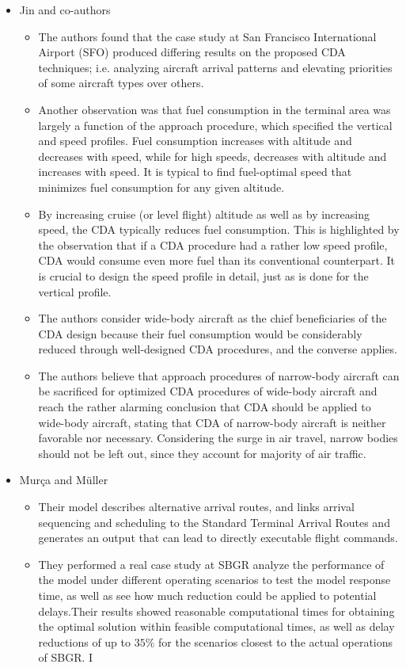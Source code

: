 \documentclass{aer1315-pretty}
\begin{document}
\begin{itemize}
\item Jin and co-authors \cite{Jin:2013} 
\begin{itemize}
\item The authors found that the case study at San Francisco International Airport (SFO) produced differing results on the proposed CDA techniques; i.e. analyzing aircraft arrival patterns and elevating priorities of some aircraft types over others.
\item Another observation was that fuel consumption in the terminal area was largely a function of the approach procedure, which specified the vertical and speed profiles. Fuel consumption increases with altitude and decreases with speed, while for high speeds, decreases with altitude and increases with speed. It is typical to find  fuel-optimal speed that minimizes fuel consumption for any given altitude.
\item By increasing cruise (or level flight) altitude as well as by increasing speed, the CDA typically reduces fuel consumption. This is highlighted by the observation that if a CDA procedure had a rather low speed profile, CDA would consume even more fuel than its conventional counterpart. It is crucial to design the speed profile in detail, just as is done for the vertical profile. 
\item The authors consider wide-body aircraft as the chief beneficiaries of the CDA design because their fuel consumption would be considerably reduced through well-designed CDA procedures, and the converse applies.
\item The authors believe that approach procedures of narrow-body aircraft can be sacrificed for optimized CDA procedures of wide-body aircraft and reach the rather alarming conclusion that CDA should be applied to wide-body aircraft, stating that CDA of narrow-body aircraft is neither favorable nor necessary. Considering the surge in air travel, narrow bodies should not be left out, since they account for majority of air traffic.
\end{itemize}



\item Mur\c{c}a and M{\"u}ller \cite{Murca:2015}

\begin{itemize}
\item Their model describes alternative arrival routes, and links arrival sequencing and scheduling to the Standard Terminal Arrival Routes and generates an output that can lead to directly executable ﬂight commands. 
\item    They performed a real case study at SBGR analyze the performance of the model under different operating scenarios to test the model response time, as well as see how much reduction could be applied to potential delays.Their results showed reasonable computational times for obtaining the optimal solution within feasible computational times, as well as delay reductions of up to $35\%$ for the scenarios closest to the actual operations of SBGR. I
\end{itemize}



\end{itemize}
\end{document}
